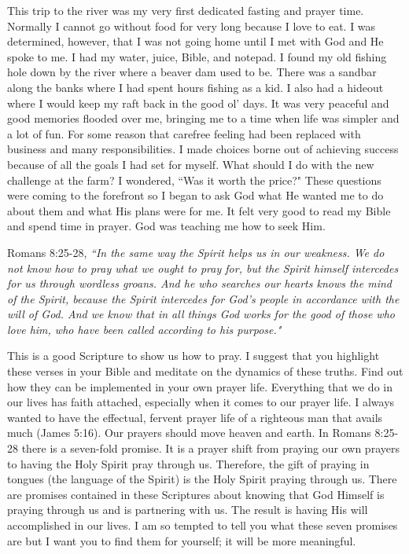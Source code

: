 \documentclass[oneside]{book}
\begin{document}
This trip to the river was my very first dedicated fasting and prayer time. Normally I cannot go without food for very long because I love to eat. I was determined, however, that I was not going home until I met with God and He spoke to me. I had my water, juice, Bible, and notepad. I found my old fishing hole down by the river where a beaver dam used to be. There was a sandbar along the banks where I had spent hours fishing as a kid. I also had a hideout where I would keep my raft back in the good ol' days. It was very peaceful and good memories flooded over me, bringing me to a time when life was simpler and a lot of fun. For some reason that carefree feeling had been replaced with business and many responsibilities. I made choices borne out of achieving success because of all the goals I had set for myself. What should I do with the new challenge at the farm? I wondered, ``Was it worth the price?" These questions were coming to the forefront so I began to ask God what He wanted me to do about them and what His plans were for me. It felt very good to read my Bible and spend time in prayer. God was teaching me how to seek Him.

Romans 8:25-28, \textit{``In the same way the Spirit helps us in our weakness. We do not know how to pray what we ought to pray for, but the Spirit himself intercedes for us through wordless groans. And he who searches our hearts knows the mind of the Spirit, because the Spirit intercedes for God's people in accordance with the will of God. And we know that in all things God works for the good of those who love him, who have been called according to his purpose."}

This is a good Scripture to show us how to pray. I suggest that you highlight these verses in your Bible and meditate on the dynamics of these truths. Find out how they can be implemented in your own prayer life. Everything that we do in our lives has faith attached, especially when it comes to our prayer life. I always wanted to have the effectual, fervent prayer life of a righteous man that avails much (James 5:16). Our prayers should move heaven and earth. In Romans 8:25-28 there is a seven-fold promise. It is a prayer shift from praying our own prayers to having the Holy Spirit pray through us. Therefore, the gift of praying in tongues (the language of the Spirit) is the Holy Spirit praying through us. There are promises contained in these Scriptures about knowing that God Himself is praying through us and is partnering with us. The result is having His will accomplished in our lives. I am so tempted to tell you what these seven promises are but I want you to find them for yourself; it will be more meaningful.
\end{document}
